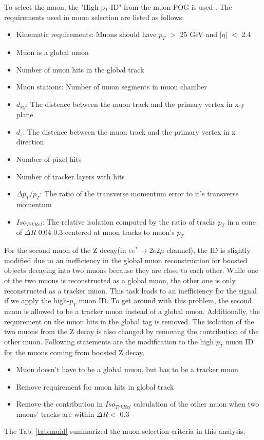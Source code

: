\label{sec:MuonID}To select the muon, the "High p$_{T}$ ID" from the muon POG is used \cite{ExoMu}. The requirements used in muon selection are listed as follows:  

\begin{itemize}
	\item Kinematic requirements: Muons should have $p_{T}$ $>$ 25 GeV and $|\eta|$ $<$ 2.4
	\item Muon is a global muon
	\item Number of muon hits in the global track 
	\item Muon stations: Number of muon segments in muon chamber  
	\item $d_{xy}$: The distence between the muon track and the primary vertex in x-y plane
	\item $d_{z}$: The distence between the muon track and the primary vertex in z direction
	\item Number of pixel hits 
	\item Number of tracker layers with hits 
	\item $\Delta p_{T}/p_{T}$: The ratio of the transverse momentum error to it's transverse momentum      
	\item $Iso_{TrkRel}$: The relative isolation computed by the ratio of tracks $p_{T}$ in a cone of $\Delta R$ 0.04-0.3 centered at muon tracks to muon's $p_{T}$    
\end{itemize}

For the second muon of the Z decay(in $ee^{*} \rightarrow 2e2\mu$ channel), the ID is slightly modified due to an inefficiency in the global muon reconstruction for boosted objects decaying into two muons because they are close to each other. While one of the two muons is reconstructed as a global muon, the other one is only reconstructed as a tracker muon. This task leads to an inefficiency for the signal if we apply the high-$p_{T}$ muon ID. To get around with this problem, the second muon is allowed to be a tracker muon instead of a global muon. Additionally, the requirement on the muon hits in the global tag is removed. The isolation of the two muons from the Z decay is also changed by removing the contribution of the other muon. Following statements are the modification to the high $p_{T}$ muon ID for the muons coming from boosted Z decay. 

\begin{itemize}
 	\item Muon doesn't have to be a global muon, but has to be a tracker muon
	\item Remove requirement for muon hits in global track
	\item Remove the contribution in $Iso_{TrkRel}$ calculation of the other muon when two muons' tracks are within $\Delta R <$ 0.3 
\end{itemize}
The Tab. \ref{tab:muid} summarized the muon selection criteria in this analysis.


